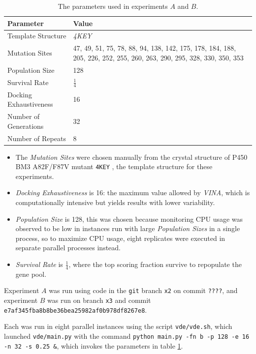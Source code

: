 \documentclass[16pt]{article}
\begin{document}
\begin{table}
        \begin{center}
		\caption{\label{config} The parameters used in experiments $A$ and $B$.}
                \begin{tabular}{l|p{3cm}}
		\textbf{Parameter} & \textbf{Value} \\
                \hline
			Template Structure & \textit{4KEY} \cite{butler2013key}\\
		Mutation Sites & 47, 49, 51, 75, 78, 88, 94, 138, 142, 175, 178, 184, 188, 205, 226, 252, 255, 260, 263, 290, 295, 328, 330, 350, 353 \\
		Population Size & 128 \\
		Survival Rate & $\frac{1}{4}$ \\
		Docking Exhaustiveness & 16 \\
		Number of Generations & 32 \\
		Number of Repeats & 8 \\
        \end{tabular}
        \end{center}
\end{table}

\begin{itemize}
	\item The \textit{Mutation Sites} were chosen manually from the crystal structure of P450 BM3 A82F/F87V mutant \texttt{4KEY} \cite{butler2013key}, the template structure for these experiments.
	\item \textit{Docking Exhaustiveness} is 16: the maximum value allowed by \textit{VINA}, which is computationally intensive but yields results with lower variability.
	\item \textit{Population Size} is 128, this was chosen because monitoring CPU usage was observed to be low in instances run with large \textit{Population Sizes} in a single process, so to maximize CPU usage, eight replicates were executed in separate parallel processes instead.

	\item \textit{Survival Rate} is $\frac{1}{4}$, where the top scoring fraction survive to repopulate the gene pool.
\end{itemize}

Experiment $A$ was run using code in the \texttt{git} branch \texttt{x2} on commit \texttt{????}, and experiment $B$ was run on branch \texttt{x3} and commit \texttt{e7af345fba8b8be36bea25982af0b978df8267e8}.

Each was run in eight parallel instances using the script \texttt{vde/vde.sh}, which launched \texttt{vde/main.py} with the command \texttt{python main.py -fn b -p 128 -e 16 -n 32 -s 0.25 \&}, which invokes the parameters in table \ref{config}.
\end{document}

